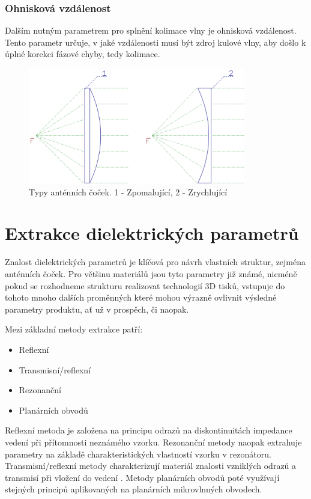 \subsubsection{Ohnisková vzdálenost}
Dalším nutným parametrem pro splnění kolimace vlny je ohnisková vzdálenost. Tento parametr určuje, v jaké vzdálenosti musí být zdroj kulové vlny, aby došlo k úplné korekci fázové chyby, tedy kolimace.


\begin{figure}[!htbp]
\begin{center}
\includegraphics[width=9.5cm]{pics/lenstypes}
\caption{Typy anténních čoček. 1 - Zpomalující, 2 - Zrychlující}
\label{fig:LensTypes}
\end{center}
\end{figure}

\section{Extrakce dielektrických parametrů}
Znalost dielektrických parametrů je klíčová pro návrh vlastních struktur, zejména anténních čoček.
Pro většinu materiálů jsou tyto parametry již známé, nicméně pokud se rozhodneme strukturu realizovat technologií 3D tisků, vstupuje do tohoto mnoho dalších proměnných které mohou výrazně ovlivnit výsledné parametry produktu, ať už v prospěch, či naopak.

Mezi základní metody extrakce patří:
\begin{itemize}
\item Reflexní
\item Transmisní/reflexní
\item Rezonanční
\item Planárních obvodů
\end{itemize}
Reflexní metoda je založena na principu odrazů na diskontinuitách impedance vedení při přítomnosti neznámého vzorku.
Rezonanční metody naopak extrahuje parametry na základě charakteristických vlastností vzorku v rezonátoru.
Transmisní/reflexní metody charakterizují materiál znalosti vzniklých odrazů a transmisí při vložení do vedení .
Metody planárních obvodů poté využívají stejných principů aplikovaných na planárních mikrovlnných obvodech.
